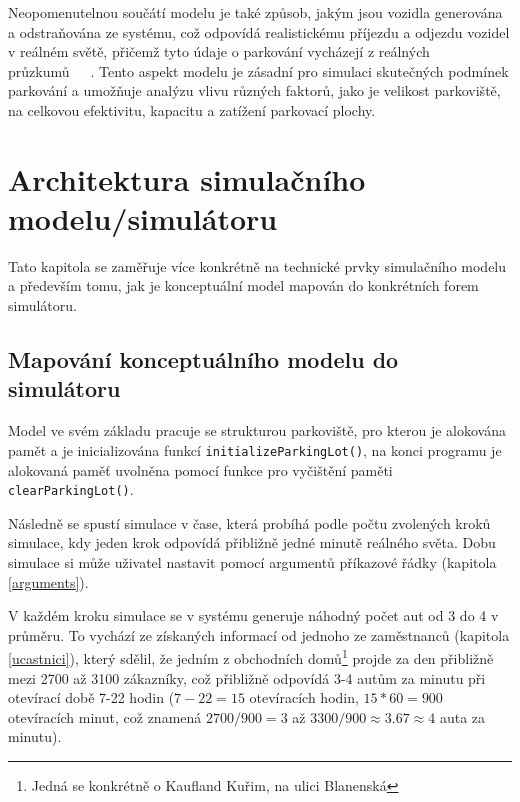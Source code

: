 \documentclass[11pt, a4paper]{article}
\begin{document}
Neopomenutelnou součátí modelu je také způsob, jakým jsou vozidla generována a odstraňována ze sys\-té\-mu, což odpovídá realistickému příjezdu a odjezdu vozidel v reálném světě, přičemž tyto údaje o parkování vy\-chá\-ze\-jí z reálných průzkumů~\cite{Arndt_Gronmo_1977}~\cite{Bawa_Sinha_Kant_2019}~\cite{Rodgers_2023}. Tento aspekt modelu je zásadní pro simulaci skutečných podmínek parkování a umožňuje analýzu vlivu různých faktorů, jako je velikost parkoviště, na celkovou efektivitu, kapacitu a zatížení parkovací plochy.


\section{Architektura simulačního modelu/simulátoru}

Tato kapitola se zaměřuje více konkrétně na technické prvky simulačního modelu a především tomu, jak je konceptuální model mapován do konkrétních forem simulátoru.

\subsection{Mapování konceptuálního modelu do simulátoru}

Model ve svém základu pracuje se strukturou parkoviště, pro kterou je alokována pamět a je inicializována funkcí \texttt{initializeParkingLot()}, na konci programu je alokovaná paměť uvolněna pomocí funkce pro vyčištění paměti \texttt{clearParkingLot()}.

\bigskip

\noindent Následně se spustí simulace v čase, která probíhá podle počtu zvolených kroků simulace, kdy jeden krok odpovídá přibližně jedné minutě reálného světa. Dobu simulace si může uživatel nastavit pomocí argumentů příkazové řádky (kapitola \ref{arguments}).

V každém kroku simulace se v systému generuje náhodný počet aut od 3 do 4 v průměru. To vychází ze získaných informací od jednoho ze zaměstnanců (kapitola \ref{ucastnici}), který sdělil, že jedním z obchodních domů\footnote{Jedná se konkrétně o Kaufland Kuřim, na ulici Blanenská} projde za den přibližně mezi 2700 až 3100 zákazníky, což přibližně odpovídá 3-4 autům za minutu při otevírací době 7-22 hodin ($ 7-22=15 $ otevíracích hodin, $ 15 * 60 = 900 $ otevíracích minut, což znamená $ 2700 / 900 = 3 $ až $ 3300 / 900 \approx 3.67 \approx 4 $ auta za minutu). 
\end{document}
